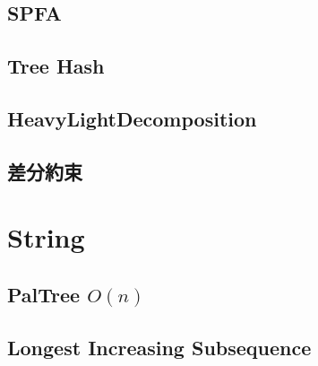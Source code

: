 \documentclass[a4paper,10pt,twocolumn,oneside]{article}
\begin{document}
\subsection{SPFA}


\subsection{Tree Hash}


\subsection{HeavyLightDecomposition}


\subsection{差分約束}


%

% 

\section{String}

\subsection{PalTree $O(n)$}


%

\subsection{Longest Increasing Subsequence}

\end{document}
